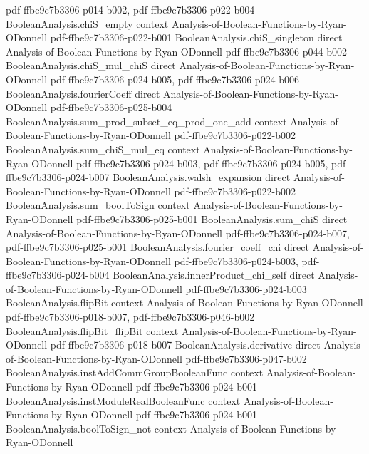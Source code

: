 \begin{theorem}
  {pdf-ffbe9c7b3306-p014-b002,
    pdf-ffbe9c7b3306-p022-b004}
\proofstep
  {BooleanAnalysis.chiS_empty}
  {context}
  {Analysis-of-Boolean-Functions-by-Ryan-ODonnell}
  {pdf-ffbe9c7b3306-p022-b001}
\proofstep
  {BooleanAnalysis.chiS_singleton}
  {direct}
  {Analysis-of-Boolean-Functions-by-Ryan-ODonnell}
  {pdf-ffbe9c7b3306-p044-b002}
\proofstep
  {BooleanAnalysis.chiS_mul_chiS}
  {direct}
  {Analysis-of-Boolean-Functions-by-Ryan-ODonnell}
  {pdf-ffbe9c7b3306-p024-b005,
    pdf-ffbe9c7b3306-p024-b006}
\proofstep
  {BooleanAnalysis.fourierCoeff}
  {direct}
  {Analysis-of-Boolean-Functions-by-Ryan-ODonnell}
  {pdf-ffbe9c7b3306-p025-b004}
\proofstep
  {BooleanAnalysis.sum_prod_subset_eq_prod_one_add}
  {context}
  {Analysis-of-Boolean-Functions-by-Ryan-ODonnell}
  {pdf-ffbe9c7b3306-p022-b002}
\proofstep
  {BooleanAnalysis.sum_chiS_mul_eq}
  {context}
  {Analysis-of-Boolean-Functions-by-Ryan-ODonnell}
  {pdf-ffbe9c7b3306-p024-b003,
    pdf-ffbe9c7b3306-p024-b005,
    pdf-ffbe9c7b3306-p024-b007}
\proofstep
  {BooleanAnalysis.walsh_expansion}
  {direct}
  {Analysis-of-Boolean-Functions-by-Ryan-ODonnell}
  {pdf-ffbe9c7b3306-p022-b002}
\proofstep
  {BooleanAnalysis.sum_boolToSign}
  {context}
  {Analysis-of-Boolean-Functions-by-Ryan-ODonnell}
  {pdf-ffbe9c7b3306-p025-b001}
\proofstep
  {BooleanAnalysis.sum_chiS}
  {direct}
  {Analysis-of-Boolean-Functions-by-Ryan-ODonnell}
  {pdf-ffbe9c7b3306-p024-b007,
    pdf-ffbe9c7b3306-p025-b001}
\proofstep
  {BooleanAnalysis.fourier_coeff_chi}
  {direct}
  {Analysis-of-Boolean-Functions-by-Ryan-ODonnell}
  {pdf-ffbe9c7b3306-p024-b003,
    pdf-ffbe9c7b3306-p024-b004}
\proofstep
  {BooleanAnalysis.innerProduct_chi_self}
  {direct}
  {Analysis-of-Boolean-Functions-by-Ryan-ODonnell}
  {pdf-ffbe9c7b3306-p024-b003}
\proofstep
  {BooleanAnalysis.flipBit}
  {context}
  {Analysis-of-Boolean-Functions-by-Ryan-ODonnell}
  {pdf-ffbe9c7b3306-p018-b007,
    pdf-ffbe9c7b3306-p046-b002}
\proofstep
  {BooleanAnalysis.flipBit_flipBit}
  {context}
  {Analysis-of-Boolean-Functions-by-Ryan-ODonnell}
  {pdf-ffbe9c7b3306-p018-b007}
\proofstep
  {BooleanAnalysis.derivative}
  {direct}
  {Analysis-of-Boolean-Functions-by-Ryan-ODonnell}
  {pdf-ffbe9c7b3306-p047-b002}
\proofstep
  {BooleanAnalysis.instAddCommGroupBooleanFunc}
  {context}
  {Analysis-of-Boolean-Functions-by-Ryan-ODonnell}
  {pdf-ffbe9c7b3306-p024-b001}
\proofstep
  {BooleanAnalysis.instModuleRealBooleanFunc}
  {context}
  {Analysis-of-Boolean-Functions-by-Ryan-ODonnell}
  {pdf-ffbe9c7b3306-p024-b001}
\proofstep
  {BooleanAnalysis.boolToSign_not}
  {context}
  {Analysis-of-Boolean-Functions-by-Ryan-ODonnell}

\end{theorem}
